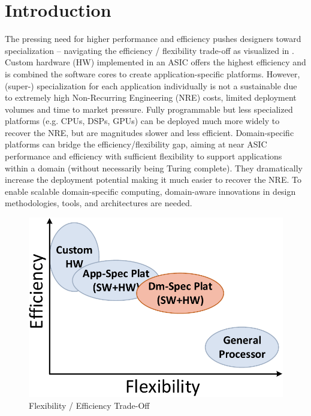 \section{Introduction}
\label{sec:introduction}

The pressing need for higher performance and efficiency pushes designers toward specialization -- navigating the efficiency / flexibility trade-off as visualized in . Custom hardware (HW) implemented in an ASIC offers the highest efficiency and is combined the software cores to create application-specific platforms. However, (super-) specialization for each application individually is not a sustainable due to extremely high Non-Recurring Engineering (NRE) costs, limited deployment volumes and time to market pressure. Fully programmable but less specialized platforms (e.g. CPUs,  DSPs, GPUs) can be deployed much more widely to recover the NRE, but are magnitudes slower and less efficient. Domain-specific platforms can bridge the efficiency/flexibility gap, aiming at near ASIC performance and efficiency with sufficient flexibility to support applications within a domain (without necessarily being Turing complete). They dramatically increase the deployment potential making it much easier to recover the NRE.  To enable scalable domain-specific computing, domain-aware innovations in design methodologies, tools, and architectures are needed. 


\begin{figure}
	\centering
	\includegraphics[width=.6\linewidth]{fig/pTradeOff.pdf}
	\caption{Flexibility / Efficiency Trade-Off}
	\label{fig:tradeOffArch}
\end{figure}


